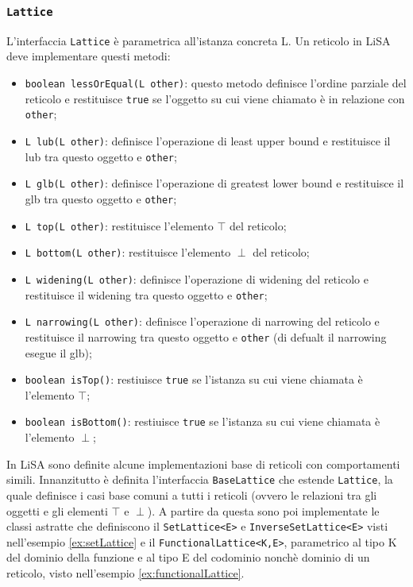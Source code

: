 \subsubsection{\texttt{Lattice}}\label{subsec:lattice}
L'interfaccia \texttt{Lattice} è parametrica all'istanza concreta L. Un reticolo in LiSA deve implementare questi metodi:
\begin{itemize}
\setlength\itemsep{0.1em}
    \item \texttt{boolean lessOrEqual(L other)}: questo metodo definisce l'ordine parziale del reticolo e restituisce \texttt{true} se l'oggetto su cui viene chiamato è in relazione con \texttt{other};
    \item \texttt{L lub(L other)}: definisce l'operazione di least upper bound e restituisce il lub tra questo oggetto e \texttt{other};
    \item \texttt{L glb(L other)}: definisce l'operazione di greatest lower bound e restituisce il glb tra questo oggetto e \texttt{other};
    \item \texttt{L top(L other)}: restituisce l'elemento \(\top\) del reticolo;
    \item \texttt{L bottom(L other)}: restituisce l'elemento \(\perp\) del reticolo;
    \item \texttt{L widening(L other)}: definisce l'operazione di widening del reticolo e restituisce il widening tra questo oggetto e \texttt{other};
    \item \texttt{L narrowing(L other)}: definisce l'operazione di narrowing del reticolo e restituisce il narrowing tra questo oggetto e \texttt{other} (di defualt il narrowing esegue il glb);
    \item \texttt{boolean isTop()}: restiuisce \texttt{true} se l'istanza su cui viene chiamata è l'elemento \(\top\);
    \item \texttt{boolean isBottom()}: restiuisce \texttt{true} se l'istanza su cui viene chiamata è l'elemento \(\perp\);
\end{itemize}
In LiSA sono definite alcune implementazioni base di reticoli con comportamenti simili. Innanzitutto è definita l'interfaccia \texttt{BaseLattice} che estende \texttt{Lattice}, la quale definisce i casi base comuni a tutti i reticoli (ovvero le relazioni tra gli oggetti e gli elementi \(\top\) e \(\perp\)). A partire da questa sono poi implementate le classi astratte che definiscono il \texttt{SetLattice<E>} e \texttt{InverseSetLattice<E>} visti nell'esempio \ref{ex:setLattice} e il \texttt{FunctionalLattice<K,E>}, parametrico al tipo K del dominio della funzione e al tipo E del codominio nonchè dominio di un reticolo, visto nell'esempio \ref{ex:functionalLattice}. 


